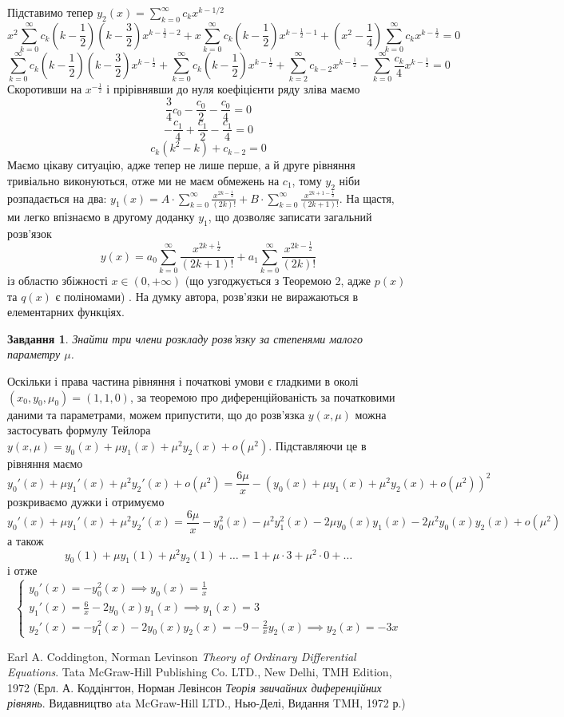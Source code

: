 \documentclass[12pt]{article} %
\newtheorem{prob}{Завдання}
\begin{document}
	Підставимо тепер $y_2(x)=\sum_{k=0}^{\infty}c_kx^{k-1/2}$
	\[x^2\sum_{k=0}^{\infty}c_k\left(k-\frac{1}{2}\right)
	\left(k-\frac{3}{2}\right)x^{k-\frac{1}{2}-2}
+x\sum_{k=0}^{\infty}c_k\left(k-\frac{1}{2}\right)x^{k-\frac{1}{2}-1}+\left(x^2-\frac{1}{4}\right)\sum_{k=0}^{\infty}c_kx^{k-\frac{1}{2}}=0\]
	\[\sum_{k=0}^{\infty}c_k\left(k-\frac{1}{2}\right)
	\left(k-\frac{3}{2}\right)x^{k-\frac{1}{2}}+\sum_{k=0}^{\infty}c_k\left(k-\frac{1}{2}\right)
	x^{k-\frac{1}{2}}+\sum_{k=2}^{\infty}c_{k-2}x^{k-\frac{1}{2}}-\sum_{k=0}^{\infty}\frac{c_k}{4}x^{k-\frac{1}{2}}=0\]
	Скоротивши на $x^{-\frac{1}{2}}$ і прірівнявши до нуля коефіцієнти ряду зліва маємо
	\[\frac{3}{4}c_0-\frac{c_0}{2}-\frac{c_0}{4}=0\]
	\[-\frac{c_1}{4}+\frac{c_1}{2}-\frac{c_1}{4}=0\]
	\[c_k(k^2-k)+c_{k-2}=0\]
	Маємо цікаву ситуацію, адже тепер не лише перше, а й друге рівняння тривіально виконуються, отже ми не маєм обмежень на $c_1$, тому
	$y_2$ ніби розпадається на два: $y_1(x)=A\cdot
	\sum_{k=0}^{\infty}\frac{x^{2k-\frac{1}{2}}}{(2k)!}+B\cdot\sum_{k=0}^{\infty}\frac{x^{2k+1-\frac{1}{2}}
	}{(2k+1)!}$. На щастя, ми легко впізнаємо в другому доданку $y_1$, що дозволяє записати загальний розв’язок
	\[y(x)=a_0\sum_{k=0}^{\infty}\frac{x^{2k+\frac{1}{2}}}{(2k+1)!}+a_1\sum_{k=0}^{\infty}\frac{x^{2k-\frac{1}{2}}}{(2k)!}\]
	із областю збіжності $x\in(0,+\infty)$ (що узгоджується з Теоремою 2, адже $p(x)$ та $q(x)$ є поліномами)
	. На думку автора, розв’язки не виражаються в елементарних функціях.
\begin{prob}Знайти три члени розкладу розв’язку за степенями малого параметру $\mu$.\end{prob}
	Оскільки і права частина рівняння і початкові умови є гладкими в околі $(x_0,y_0,\mu_0)=(1,1,0)$, за теоремою
	про диференційованість за початковими даними та параметрами, можем припустити, що до розв’язка $y(x,\mu)$ можна застосувать
	формулу Тейлора $y(x,\mu)=y_0(x)+\mu y_1(x)+\mu^2y_2(x)+o(\mu^2)$. Підставляючи це в рівняння маємо
	\[y_0'(x)+\mu y_1'(x)+\mu^2y_2'(x)+o(\mu^2)=\frac{6\mu}{x}-(y_0(x)+\mu y_1(x)+\mu^2y_2(x)+o(\mu^2))^2\]
	розкриваємо дужки і отримуємо
	\[y_0'(x)+\mu y_1'(x)+\mu^2y_2'(x)=\frac{6\mu}{x}-y_0^2(x)-\mu^2y_1^2(x)-2\mu y_0(x)y_1(x)-2\mu^2y_0(x)y_2(x)+o(\mu^2)\]
	а також
	\[y_0(1)+\mu y_1(1)+\mu^2 y_2(1)+\dots=1+\mu\cdot 3+\mu^2\cdot0+\dots\]
	і отже 
	\[\begin{cases}
		y_0'(x)=-y_0^2(x)\implies y_0(x)=\frac{1}{x}\\
		y_1'(x)=\frac{6}{x}-2y_0(x)y_1(x)\implies y_1(x)=3\\
		y_2'(x)=-y_1^2(x)-2y_0(x)y_2(x)=-9-\frac{2}{x}y_2(x)\implies y_2(x)=-3x
	\end{cases}\]
\begin{thebibliography}{9}
	Earl A. Coddington, Norman Levinson
\emph{Theory of Ordinary Differential Equations}. Tata McGraw-Hill Publishing Co. LTD., New Delhi, TMH Edition, 1972 (Ерл. А. Коддінгтон,
Норман Левінсон \textit{Теорія звичайних диференційних рівнянь}. Видавництво ata McGraw-Hill LTD., Нью-Делі, Видання TMH, 1972 р.)
\end{thebibliography}
\end{document}

